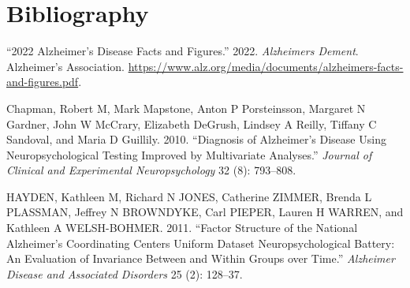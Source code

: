 \documentclass[
]{article}
\newlength{\cslhangindent}
\newlength{\cslentryspacingunit} %
\newenvironment{CSLReferences}[2] %
 {%
  \setlength{\parindent}{0pt}
  \ifodd #1
  \let\oldpar\par
  \def\par{\hangindent=\cslhangindent\oldpar}
  \fi
  \setlength{\parskip}{#2\cslentryspacingunit}
 }%
 {}
\begin{document}
\newpage{}

\hypertarget{bibliography}{%
\section*{Bibliography}\label{bibliography}}

\hypertarget{refs}{}
\begin{CSLReferences}{1}{0}
\leavevmode{}%
{``2022 Alzheimer's Disease Facts and Figures.''} 2022. \emph{Alzheimers Dement}. Alzheimer's Association. \url{https://www.alz.org/media/documents/alzheimers-facts-and-figures.pdf}.

\leavevmode{}%
Chapman, Robert M, Mark Mapstone, Anton P Porsteinsson, Margaret N Gardner, John W McCrary, Elizabeth DeGrush, Lindsey A Reilly, Tiffany C Sandoval, and Maria D Guillily. 2010. {``Diagnosis of Alzheimer's Disease Using Neuropsychological Testing Improved by Multivariate Analyses.''} \emph{Journal of Clinical and Experimental Neuropsychology} 32 (8): 793--808.

\leavevmode{}%
HAYDEN, Kathleen M, Richard N JONES, Catherine ZIMMER, Brenda L PLASSMAN, Jeffrey N BROWNDYKE, Carl PIEPER, Lauren H WARREN, and Kathleen A WELSH-BOHMER. 2011. {``Factor Structure of the National Alzheimer's Coordinating Centers Uniform Dataset Neuropsychological Battery: An Evaluation of Invariance Between and Within Groups over Time.''} \emph{Alzheimer Disease and Associated Disorders} 25 (2): 128--37.

\end{CSLReferences}
\end{document}
